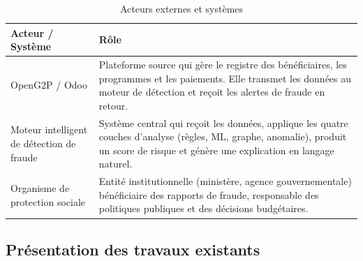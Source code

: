 \documentclass[a4paper, oneside, 12pt]{book}
\newcommand{\thead}[1]{\cellcolor{EYdark}\textcolor{white}{\textbf{#1}}}
\renewcommand{\thead}[1]{\cellcolor{EYyellow}\textcolor{EYdark}{\textbf{#1}}}
\begin{document}
\begin{table}[H]
\centering
\renewcommand{\arraystretch}{1.4}
\begin{tabular}{|p{4cm}|p{11cm}|}
\hline
\centering\thead{Acteur / Système} & \centering\arraybackslash\thead{Rôle} \\
\hline
OpenG2P / Odoo &
Plateforme source qui gère le registre des bénéficiaires, les programmes et les paiements. Elle transmet les données au moteur de détection et reçoit les alertes de fraude en retour. \\
\hline
Moteur intelligent  de détection de fraude &
Système central qui reçoit les données, applique les quatre couches d'analyse (règles, ML, graphe, anomalie), produit un score de risque et génère une explication en langage naturel. \\
\hline
Organisme de protection sociale &
Entité institutionnelle (ministère, agence gouvernementale) bénéficiaire des rapports de fraude, responsable des politiques publiques et des décisions budgétaires. \\
\hline
\end{tabular}
\caption{Acteurs externes et systèmes}
\label{tab:acteurs_externes}
\end{table}


\subsection{Présentation des travaux existants}
\end{document}

